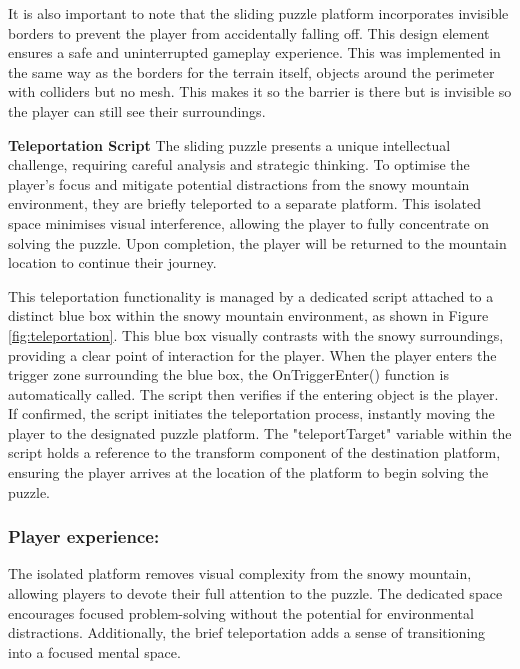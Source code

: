 \documentclass{l4proj}
\begin{document}
It is also important to note that the sliding puzzle platform incorporates invisible borders to prevent the player from accidentally falling off. This design element ensures a safe and uninterrupted gameplay experience. This was implemented in the same way as the borders for the terrain itself, objects around the perimeter with colliders but no mesh. This makes it so the barrier is there but is invisible so the player can still see their surroundings.
\newline

\textbf{Teleportation Script} \newline
The sliding puzzle presents a unique intellectual challenge, requiring careful analysis and strategic thinking. To optimise the player's focus and mitigate potential distractions from the snowy mountain environment, they are briefly teleported to a separate platform. This isolated space minimises visual interference, allowing the player to fully concentrate on solving the puzzle. Upon completion, the player will be returned to the mountain location to continue their journey.

This teleportation functionality is managed by a dedicated script attached to a distinct blue box within the snowy mountain environment, as shown in Figure \ref{fig:teleportation}. This blue box visually contrasts with the snowy surroundings, providing a clear point of interaction for the player. When the player enters the trigger zone surrounding the blue box, the OnTriggerEnter() function is automatically called. The script then verifies if the entering object is the player. If confirmed, the script initiates the teleportation process, instantly moving the player to the designated puzzle platform. The "teleportTarget" variable within the script holds a reference to the transform component of the destination platform, ensuring the player arrives at the location of the platform to begin solving the puzzle.

\subsubsection{Player experience:} The isolated platform removes visual complexity from the snowy mountain, allowing players to devote their full attention to the puzzle. The dedicated space encourages focused problem-solving without the potential for environmental distractions. Additionally,  the brief teleportation adds a sense of transitioning into a focused mental space.
\end{document}
